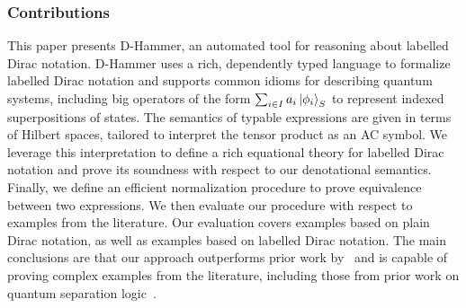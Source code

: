 \subsubsection*{Contributions}
This paper presents D-Hammer, an automated tool for reasoning about labelled Dirac notation. D-Hammer uses a rich, dependently typed language to formalize labelled Dirac notation and supports common idioms for describing quantum systems, including big operators of the form \( \sum_{i \in I} a_i \ket{\phi_i}_S \) to represent indexed superpositions of states. The semantics of typable expressions are given in terms of Hilbert spaces, tailored to interpret the tensor product as an AC symbol. We leverage this interpretation to define a rich equational theory for labelled Dirac notation and prove its soundness with respect to our denotational semantics. Finally, we define an efficient normalization procedure to prove equivalence between two expressions. We then evaluate our procedure with respect to examples from the literature. Our evaluation covers examples based on plain Dirac notation, as well as examples based on
labelled Dirac notation. The main conclusions are that our approach outperforms prior work by~\cite{diracdec} and is capable of proving complex examples from the literature, including those from prior work on quantum separation logic~\cite{DBLP:conf/lics/ZhouBHYY21}.





